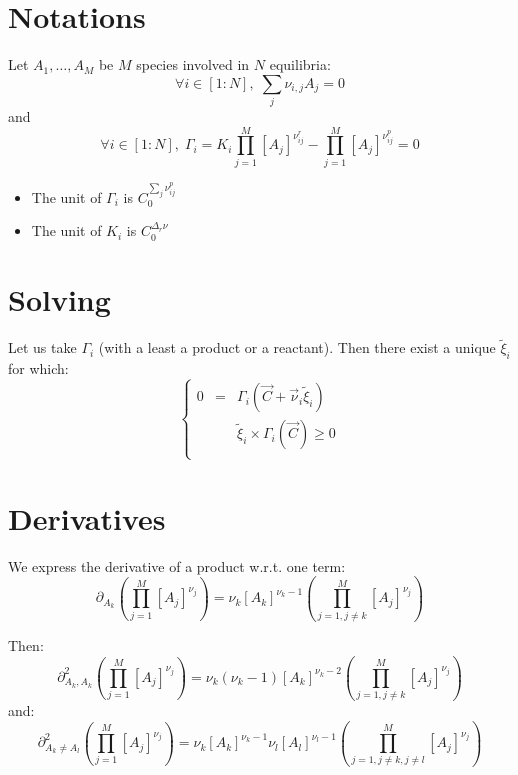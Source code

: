 \documentclass[aps,12pt]{revtex4}
\begin{document}
\section{Notations}

Let $A_1,\ldots,A_M$ be $M$ species involved in $N$ equilibria:
\begin{equation}
	\forall i\in[1:N], \; \sum_j \nu_{i,j} A_j = 0
\end{equation}
and
\begin{equation}
	\forall i\in[1:N], \; 
	\Gamma_i = K_i \prod_{j=1}^{M} [A_j]^{\nu^r_{ij}} 
	- \prod_{j=1}^{M} [A_j]^{\nu^p_{ij}} = 0
\end{equation}

\begin{itemize}
\item The unit of $\Gamma_i$ is $C_0^{\sum_j \nu^p_{ij} }$
\item The unit of $K_i$ is $C_0^{\Delta_r \nu}$
\end{itemize}

\section{Solving}
Let us take $\Gamma_i$ (with a least a product or a reactant).
Then there exist a unique $\tilde{\xi}_i$ for which:
\begin{equation}
\left\lbrace
\begin{array}{rcl}
	0 & = &\Gamma_i(\vec{C} + \vec{\nu}_i \tilde{\xi}_i)\\
	& & \tilde{\xi}_i \times \Gamma_i(\vec{C}) \geq 0\\
\end{array}
\right.
\end{equation}

\section{Derivatives}
We express the derivative of a product w.r.t. one term:
\begin{equation}
	\partial_{A_k} \left( \prod_{j=1}^{M} [A_j]^{\nu_{j}} \right)  =
	\nu_k [A_k]^{\nu_k-1} \left( \prod_{j=1,j\not=k}^{M} [A_j]^{\nu_{j}} \right)
\end{equation}

Then:
\begin{equation}
	\partial^2_{A_k, A_k} \left( \prod_{j=1}^{M} [A_j]^{\nu_{j}} \right)  =
	\nu_k (\nu_k-1) [A_k]^{\nu_k-2} \left( \prod_{j=1,j\not=k}^{M} [A_j]^{\nu_{j}} \right)
\end{equation}
and:
\begin{equation}
	\partial^2_{A_k\not=A_l} \left( \prod_{j=1}^{M} [A_j]^{\nu_{j}} \right)  =
	\nu_k [A_k]^{\nu_k-1} \nu_l [A_l]^{\nu_l-1}\left( \prod_{j=1,j\not=k,j\not=l}^{M} [A_j]^{\nu_{j}} \right)
\end{equation}
\end{document}
